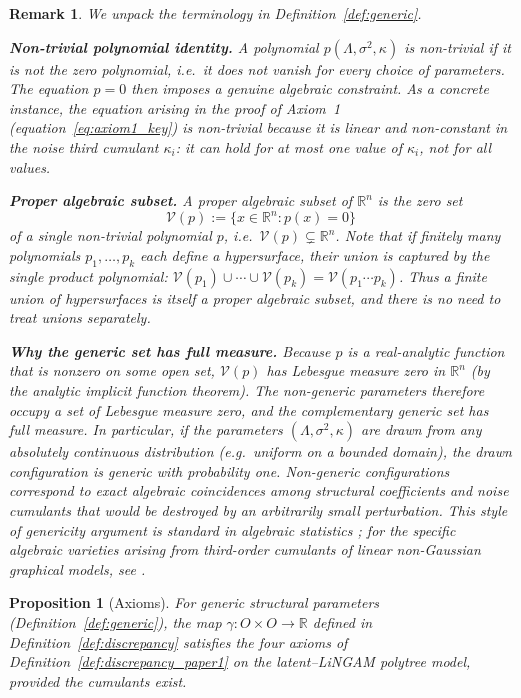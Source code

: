 \documentclass[11pt,a4paper]{article}
\numberwithin{equation}{section}
\newtheorem{proposition}[theorem]{Proposition}
\newtheorem{remark}[theorem]{Remark}
\begin{document}
\begin{remark}\label{rem:generic}
We unpack the terminology in Definition~\ref{def:generic}.

\medskip\noindent
\textbf{Non-trivial polynomial identity.}
A polynomial $p(\Lambda,\sigma^{2},\kappa)$ is \emph{non-trivial} if it is
not the zero polynomial, i.e.\ it does not vanish for \emph{every} choice
of parameters.  The equation $p=0$ then imposes a genuine algebraic
constraint.  As a concrete instance, the equation arising in the proof of
Axiom~1 (equation~\eqref{eq:axiom1_key}) is non-trivial because it is
linear and non-constant in the noise third cumulant $\kappa_i$: it can
hold for at most one value of $\kappa_i$, not for all values.

\medskip\noindent
\textbf{Proper algebraic subset.}
A \emph{proper algebraic subset} of $\mathbb{R}^{n}$ is the zero set
\[
  \mathcal{V}(p) := \{x \in \mathbb{R}^{n} : p(x) = 0\}
\]
of a single non-trivial polynomial $p$, i.e.\ $\mathcal{V}(p) \subsetneq \mathbb{R}^{n}$.
Note that if finitely many polynomials $p_1, \ldots, p_k$ each define a
hypersurface, their union is captured by the single product polynomial:
$\mathcal{V}(p_1) \cup \cdots \cup \mathcal{V}(p_k) = \mathcal{V}(p_1 \cdots p_k)$.
Thus a finite union of hypersurfaces is itself a proper algebraic subset,
and there is no need to treat unions separately.

\medskip\noindent
\textbf{Why the generic set has full measure.}
Because $p$ is a real-analytic function that is nonzero on some open set,
$\mathcal{V}(p)$ has Lebesgue measure zero in $\mathbb{R}^n$ (by the
analytic implicit function theorem).  The \emph{non-generic} parameters
therefore occupy a set of Lebesgue measure zero, and the complementary
\emph{generic} set has full measure.  In particular, if the parameters
$(\Lambda,\sigma^{2},\kappa)$ are drawn from any absolutely continuous
distribution (e.g.\ uniform on a bounded domain), the drawn configuration
is generic with probability one.  Non-generic configurations correspond to
exact algebraic coincidences among structural coefficients and noise
cumulants that would be destroyed by an arbitrarily small perturbation.
This style of genericity argument is standard in algebraic statistics
\citep{drton:strumfeld:2009}; for the specific algebraic varieties arising
from third-order cumulants of linear non-Gaussian graphical models, see
\citet{amendola:drton:2021}.
\end{remark}

\begin{proposition}[Axioms]\label{prop:axioms}
For generic structural parameters 
(Definition~\ref{def:generic}), the map 
$\gamma:O\times O\to\mathbb R$ defined in 
Definition~\ref{def:discrepancy} satisfies the four axioms of 
Definition~\ref{def:discrepancy_paper1} on the latent--LiNGAM polytree 
model, provided the cumulants exist.
\end{proposition}
\end{document}
